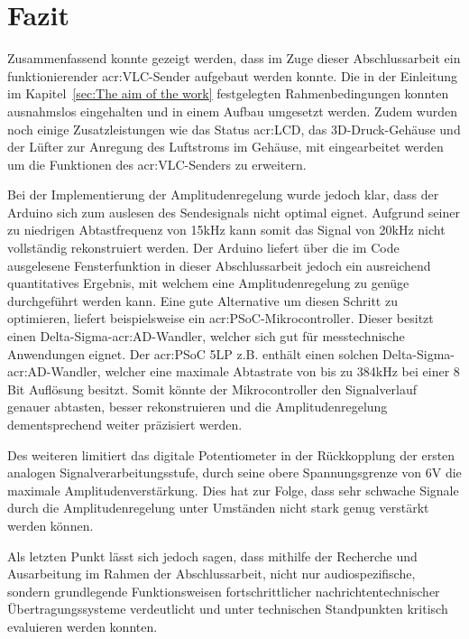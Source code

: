 
\chapter{Fazit}
\label{sec:conclusion_future-work}

Zusammenfassend konnte gezeigt werden, dass im Zuge dieser Abschlussarbeit ein funktionierender \gls{acr:VLC}-Sender aufgebaut werden konnte. Die in der Einleitung im Kapitel~\ref{sec:The aim of the work} festgelegten Rahmenbedingungen konnten ausnahmslos eingehalten und in einem Aufbau umgesetzt werden. Zudem wurden noch einige Zusatzleistungen wie das Status \gls{acr:LCD}, das 3D-Druck-Gehäuse und der Lüfter zur Anregung des Luftstroms im Gehäuse, mit eingearbeitet werden um die Funktionen des \gls{acr:VLC}-Senders zu erweitern. 

Bei der Implementierung der Amplitudenregelung wurde jedoch klar, dass der Arduino sich zum auslesen des Sendesignals nicht optimal eignet. Aufgrund seiner zu niedrigen Abtastfrequenz von 15kHz kann somit das Signal von 20kHz nicht vollständig rekonstruiert werden. Der Arduino liefert über die im Code ausgelesene Fensterfunktion in dieser Abschlussarbeit jedoch ein ausreichend quantitatives Ergebnis, mit welchem eine Amplitudenregelung zu genüge durchgeführt werden kann. Eine gute Alternative um diesen Schritt zu optimieren, liefert beispielsweise ein \gls{acr:PSoC}-Mikrocontroller. Dieser besitzt einen Delta-Sigma-\gls{acr:AD}-Wandler, welcher sich gut für messtechnische Anwendungen eignet. Der \gls{acr:PSoC} 5LP z.B. enthält einen solchen Delta-Sigma-\gls{acr:AD}-Wandler, welcher eine maximale Abtastrate von bis zu 384kHz bei einer 8 Bit Auflösung besitzt. Somit könnte der Mikrocontroller den Signalverlauf genauer abtasten, besser rekonstruieren und die Amplitudenregelung dementsprechend weiter präzisiert werden. 

Des weiteren limitiert das digitale Potentiometer in der Rückkopplung der ersten analogen Signalverarbeitungsstufe, durch seine obere Spannungsgrenze von 6V die maximale Amplitudenverstärkung. Dies hat zur Folge, dass sehr schwache Signale durch die Amplitudenregelung unter Umständen nicht stark genug verstärkt werden können.

Als letzten Punkt lässt sich jedoch sagen, dass mithilfe der Recherche und Ausarbeitung im Rahmen der Abschlussarbeit, nicht nur audiospezifische, sondern grundlegende Funktionsweisen fortschrittlicher nachrichtentechnischer Übertragungssysteme verdeutlicht und unter technischen Standpunkten kritisch evaluieren werden konnten.